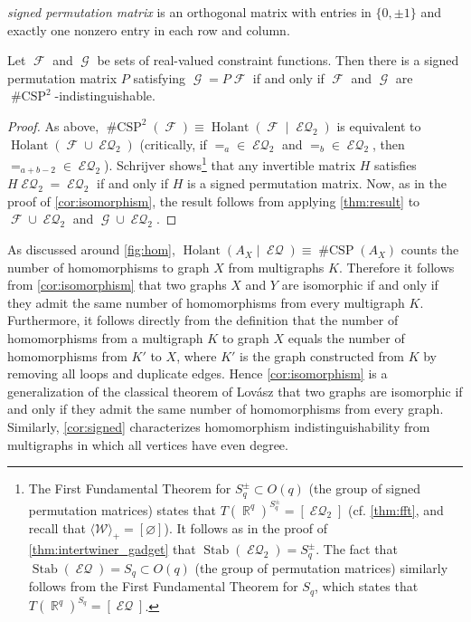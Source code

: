 \documentclass{theoretics}
\DeclareMathOperator{\rr}{\mathbb{R}}
\DeclareMathOperator{\fc}{\mathcal{F}}
\DeclareMathOperator{\gc}{\mathcal{G}}
\DeclareMathOperator{\stab}{Stab}
\DeclareMathOperator{\holant}{Holant}
\DeclareMathOperator{\csp}{\#CSP}
\DeclareMathOperator{\eq}{\mathcal{EQ}}
\begin{document}
\emph{signed permutation matrix} is an orthogonal matrix with entries
in $\{0,\pm 1\}$ and exactly one nonzero entry in each row and column.
\begin{corollary}\label{cor:signed}
    Let $\fc$ and $\gc$ be sets of real-valued constraint functions.
    Then there is a signed permutation matrix $P$ satisfying $\gc = P\fc$ if and only if
    $\fc$ and $\gc$ are $\csp^2$-indistinguishable.
\end{corollary}
\begin{proof}
    As above, $\csp^2(\fc) \equiv \holant(\fc \mid \eq_2)$ is equivalent to
    $\holant(\fc \cup \eq_2)$
    (critically, if $=_a \in \eq_2$ and $=_b \in \eq_2$, then $=_{a+b-2} \in \eq_2$). 
    Schrijver \cite{schrijver_tensor_2008} 
    shows\footnote{The First Fundamental Theorem for $S_q^{\pm} \subset O(q)$ (the group of signed
        permutation matrices) states that $T(\rr^q)^{S_q^{\pm}} = [\eq_2]$
        (cf. \autoref{thm:fft}, and recall that $\langle \mathcal{W} \rangle_+ = [\varnothing]$).
        It follows as in the proof of \autoref{thm:intertwiner_gadget} that $\stab(\eq_2) = S_q^{\pm}$.
        The fact that $\stab(\eq) = S_q \subset O(q)$ (the group of permutation matrices) similarly follows
        from the First Fundamental Theorem for $S_q$, which states that
        $T(\rr^q)^{S_q} = [\eq]$.
    }
    that any invertible matrix $H$ satisfies $H\eq_2 = \eq_2$ if and only if $H$ is a signed 
    permutation matrix. 
    Now, as in the proof of \autoref{cor:isomorphism}, the result follows from applying
    \autoref{thm:result} to $\fc \cup \eq_2$ and $\gc \cup \eq_2$.
\end{proof}
As discussed around \autoref{fig:hom}, $\holant(A_X \mid \eq) \equiv \csp(A_X)$ counts the 
number of homomorphisms to graph $X$ from multigraphs $K$. Therefore it follows from
\autoref{cor:isomorphism} that two graphs $X$ and $Y$ are isomorphic if and only if they
admit the same number of homomorphisms from every multigraph $K$. Furthermore, it follows 
directly from the definition that the number of homomorphisms from a multigraph $K$ to graph 
$X$ equals the number of homomorphisms 
from $K'$ to $X$, where $K'$ is the graph constructed from $K$ by
removing all loops and duplicate edges. Hence \autoref{cor:isomorphism}
is a generalization of the classical theorem of Lovász 
\cite{lovasz_operations} that two graphs are isomorphic if and only if they admit the same 
number of homomorphisms from every graph. Similarly, \autoref{cor:signed} characterizes
homomorphism indistinguishability from multigraphs in which all vertices have even degree.
\end{document}
